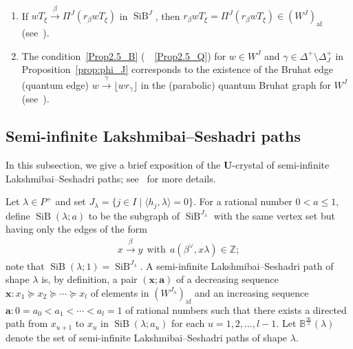 \documentclass[ALCO,ThmDefs,Unicode,epreuves]{cedram}
\newcommand{\BZ}{\mathbb{Z}}
\newcommand\bm[1]{\boldsymbol{#1}}
\renewcommand{\U}{\mathbf{U}}
\newcommand{\si}{\frac{\infty}{2}}
\DeclareMathOperator{\af}{af}
\DeclareMathOperator{\SiB}{SiB}
\begin{document}
\begin{rema}\ \\[-1.2em]
\begin{enumerate}[label=(\arabic*)]
\item\label{Rema2.6_1}
If 
$wT_{\xi} \xrightarrow{\ \beta \ } \Pi^J(r_{\beta}wT_{\xi})$
in 
$\SiB ^J$, 
then 
$r_{\beta}wT_{\xi} = \Pi^J (r_{\beta}wT_{\xi}) \in (W^J)_{\af}$
(see~\cite[Appendix~A]{INS16}). 
\item\label{Rema2.6_2}
The condition~\ref{Prop2.5_B} (\resp~~\ref{Prop2.5_Q}) for 
$w \in W^J$ 
and 
$\gamma \in \Delta^+ \setminus \Delta^+_J$ 
in Proposition~\ref{prop:phi_J} corresponds to the existence of the 
Bruhat edge (\resp quantum edge) 
$w \xrightarrow{\ \gamma \ } \lfloor w r_{\gamma} \rfloor$
in the (parabolic) quantum Bruhat graph for 
$W^J$
(see~\cite[\S~4]{LNSSS15}).
\end{enumerate}
\end{rema}

\subsection{Semi-infinite Lakshmibai--Seshadri paths}

In this subsection, 
we give a brief exposition of the 
$\U$-crystal of semi-infinite Lakshmibai--Seshadri paths; 
see~\cite{INS16} for more details.

Let 
$\lambda \in P^+$
and set 
$J_{\lambda} = \{ j \in I \mid \langle h_j , \lambda \rangle = 0 \}$. 
For a rational number 
$0 < a \leq 1$, 
define 
$\SiB (\lambda;a)$
to be the subgraph of 
$\SiB ^{J_{\lambda}}$ 
with the same vertex set 
but having only the edges of the form 
\begin{align}
x \xrightarrow{\ \beta \ } y
\ \ \text{with} \ \ 
a ( \beta^{\vee} , x\lambda ) \in \BZ ;
\end{align}
note that 
$\SiB (\lambda ; 1) = \SiB ^{J_{\lambda}}$. 
A semi-infinite Lakshmibai--Seshadri path of shape $\lambda$ is, by definition, 
a pair 
$(\bm{x}; \bm{a})$
of a decreasing sequence 
$\bm{x} : x_1 \succeq x_2 \succeq \cdots \succeq x_l$ 
of elements in $(W^{J_{\lambda}})_{\af}$
and an increasing sequence
$\bm{a} : 0 = a_0 < a_1 < \cdots < a_l = 1$ 
of rational numbers such that 
there exists a directed path from
$x_{u+1}$ to $x_u$ in $\SiB (\lambda;a_u)$ 
for each $u=1,2,\ldots ,l-1$. 
Let 
$\mathbb{B}^{\si}(\lambda)$ 
denote the set of semi-infinite Lakshmibai--Seshadri paths of shape $\lambda$. 
\end{document}
